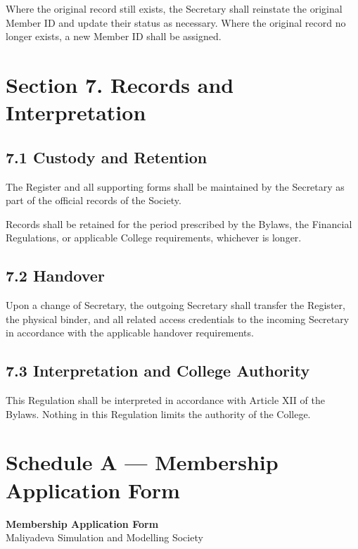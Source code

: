 \documentclass[a4paper]{article}
\newcommand{\formtitle}[2]{%
    \begin{center}
        {\Large\bfseries #1}\\[0.4em]
        {\normalsize #2}
    \end{center}
    \vspace{0.5em}
}
\begin{document}
Where the original record still exists, the Secretary shall reinstate
the original Member ID and update their status as necessary. Where
the original record no longer exists, a new Member ID shall be
assigned.

\section*{Section 7. Records and Interpretation}

\subsection*{7.1 Custody and Retention}
The Register and all supporting forms shall be maintained by the
Secretary as part of the official records of the Society.

Records shall be retained for the period prescribed by the Bylaws, the
Financial Regulations, or applicable College requirements, whichever
is longer.

\subsection*{7.2 Handover}

Upon a change of Secretary, the outgoing Secretary shall transfer the
Register, the physical binder, and all related access credentials to
the incoming Secretary in accordance with the applicable handover
requirements.

\subsection*{7.3 Interpretation and College Authority}
This Regulation shall be interpreted in accordance with Article XII of
the Bylaws. Nothing in this Regulation limits the authority of the
College.

\clearpage
\section*{Schedule A --- Membership Application Form}

\formtitle{Membership Application Form}{Maliyadeva Simulation and Modelling Society}
\end{document}
